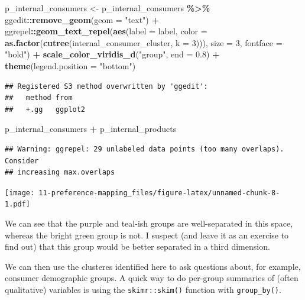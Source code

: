 \documentclass[
]{book}
\newenvironment{Shaded}{\begin{snugshade}}{\end{snugshade}}
\newcommand{\AttributeTok}[1]{\textcolor[rgb]{0.13,0.29,0.53}{#1}}
\newcommand{\DecValTok}[1]{\textcolor[rgb]{0.00,0.00,0.81}{#1}}
\newcommand{\FloatTok}[1]{\textcolor[rgb]{0.00,0.00,0.81}{#1}}
\newcommand{\FunctionTok}[1]{\textcolor[rgb]{0.13,0.29,0.53}{\textbf{#1}}}
\newcommand{\NormalTok}[1]{#1}
\newcommand{\OtherTok}[1]{\textcolor[rgb]{0.56,0.35,0.01}{#1}}
\newcommand{\SpecialCharTok}[1]{\textcolor[rgb]{0.81,0.36,0.00}{\textbf{#1}}}
\newcommand{\StringTok}[1]{\textcolor[rgb]{0.31,0.60,0.02}{#1}}
\begin{document}
\begin{Shaded}
\begin{Highlighting}[]
\NormalTok{p\_internal\_consumers }\OtherTok{\textless{}{-}} 
\NormalTok{  p\_internal\_consumers }\SpecialCharTok{\%\textgreater{}\%}
\NormalTok{  ggedit}\SpecialCharTok{::}\FunctionTok{remove\_geom}\NormalTok{(}\AttributeTok{geom =} \StringTok{"text"}\NormalTok{) }\SpecialCharTok{+}
\NormalTok{  ggrepel}\SpecialCharTok{::}\FunctionTok{geom\_text\_repel}\NormalTok{(}\FunctionTok{aes}\NormalTok{(}\AttributeTok{label =}\NormalTok{ label, }
                               \AttributeTok{color =} \FunctionTok{as.factor}\NormalTok{(}\FunctionTok{cutree}\NormalTok{(internal\_consumer\_cluster, }\AttributeTok{k =} \DecValTok{3}\NormalTok{))),}
                           \AttributeTok{size =} \DecValTok{3}\NormalTok{, }\AttributeTok{fontface =} \StringTok{"bold"}\NormalTok{) }\SpecialCharTok{+} 
  \FunctionTok{scale\_color\_viridis\_d}\NormalTok{(}\StringTok{"group"}\NormalTok{, }\AttributeTok{end =} \FloatTok{0.8}\NormalTok{) }\SpecialCharTok{+} 
  \FunctionTok{theme}\NormalTok{(}\AttributeTok{legend.position =} \StringTok{"bottom"}\NormalTok{) }
\end{Highlighting}
\end{Shaded}

\begin{verbatim}
## Registered S3 method overwritten by 'ggedit':
##   method from   
##   +.gg   ggplot2
\end{verbatim}

\begin{Shaded}
\begin{Highlighting}[]
\NormalTok{p\_internal\_consumers }\SpecialCharTok{+}\NormalTok{ p\_internal\_products}
\end{Highlighting}
\end{Shaded}

\begin{verbatim}
## Warning: ggrepel: 29 unlabeled data points (too many overlaps). Consider
## increasing max.overlaps
\end{verbatim}

\texttt{[image: 11-preference-mapping\_files/figure-latex/unnamed-chunk-8-1.pdf]}

We can see that the purple and teal-ish groups are well-separated in this space, whereas the bright green group is not. I suspect (and leave it as an exercise to find out) that this group would be better separated in a third dimension.

We can then use the clusteres identified here to ask questions about, for example, consumer demographic groups. A quick way to do per-group summaries of (often qualitative) variables is using the \texttt{skimr::skim()} function with \texttt{group\_by()}.
\end{document}
